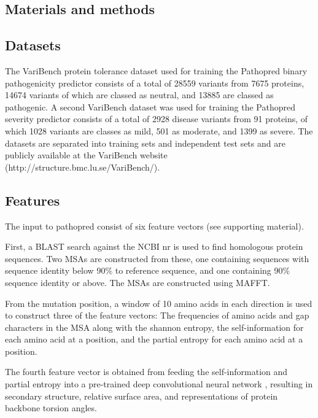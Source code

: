 \documentclass{bioinfo}
\begin{document}
\begin{methods}

\section{Materials and methods}

\subsection{Datasets}

The VariBench protein tolerance dataset used for training the Pathopred
binary pathogenicity predictor consists of a total of 28559 variants
from 7675 proteins, 14674 variants of which are classed as neutral,
and 13885 are classed as pathogenic. A second VariBench dataset was
used for training the Pathopred severity predictor
consists of a total of 2928 disease variants from 91 proteins, of
which 1028 variants are classes as mild, 501 as moderate, and 1399 as
severe. The datasets are separated into training sets and independent
test sets and are publicly available at the VariBench website (http://structure.bmc.lu.se/VariBench/).

\subsection{Features}

The input to pathopred consist of six feature vectors (see supporting
material).  

First, a BLAST search against the NCBI nr is used to find homologous
protein sequences. Two MSAs are constructed from these, one containing
sequences with sequence identity below 90\% to reference sequence, and
one containing 90\% sequence identity or above. The MSAs are
constructed using MAFFT.

From the mutation position, a window of 10 amino acids in each
direction is used to construct three of the feature vectors: The
frequencies of amino acids and gap characters in the MSA along with
the shannon entropy, the self-information \citep{Hurtado2018} for each
amino acid at a position, and the partial entropy \citep{Hurtado2018}
for each amino acid at a position.

The fourth feature vector is obtained from feeding the self-information
and partial entropy into a pre-trained deep convolutional neural
network \citep{Hurtado2018}, resulting in secondary structure,
relative surface area, and representations of protein backbone torsion
angles.


\end{methods}
\end{document}
